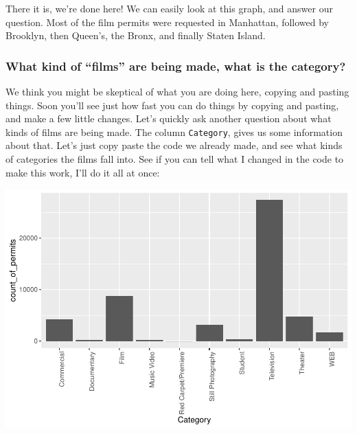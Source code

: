 \documentclass[]{book}
\newenvironment{Shaded}{\begin{snugshade}}{\end{snugshade}}
\newcommand{\KeywordTok}[1]{\textcolor[rgb]{0.13,0.29,0.53}{\textbf{#1}}}
\newcommand{\DataTypeTok}[1]{\textcolor[rgb]{0.13,0.29,0.53}{#1}}
\newcommand{\DecValTok}[1]{\textcolor[rgb]{0.00,0.00,0.81}{#1}}
\newcommand{\StringTok}[1]{\textcolor[rgb]{0.31,0.60,0.02}{#1}}
\newcommand{\OperatorTok}[1]{\textcolor[rgb]{0.81,0.36,0.00}{\textbf{#1}}}
\newcommand{\NormalTok}[1]{#1}
\begin{document}
There it is, we're done here! We can easily look at this graph, and
answer our question. Most of the film permits were requested in
Manhattan, followed by Brooklyn, then Queen's, the Bronx, and finally
Staten Island.

\subsubsection{\texorpdfstring{What kind of ``films'' are being made,
what is the
category?}{What kind of films are being made, what is the category?}}\label{what-kind-of-films-are-being-made-what-is-the-category}

We think you might be skeptical of what you are doing here, copying and
pasting things. Soon you'll see just how fast you can do things by
copying and pasting, and make a few little changes. Let's quickly ask
another question about what kinds of films are being made. The column
\texttt{Category}, gives us some information about that. Let's just copy
paste the code we already made, and see what kinds of categories the
films fall into. See if you can tell what I changed in the code to make
this work, I'll do it all at once:

\begin{Shaded}
\end{Shaded}

\includegraphics{Statistics_Lab_files/figure-latex/1category-1.pdf}
\end{document}
